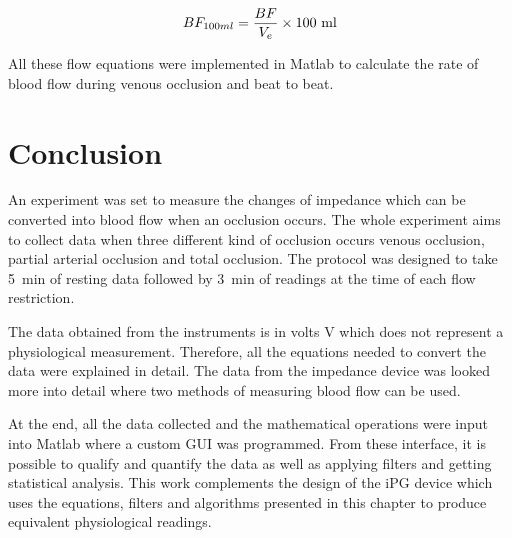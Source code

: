 \begin{align}
	\label{eq:bfpct}
	BF_{100ml} = \frac{BF}{V_e} \times \text{100 ml} \tagaddtext{[\si{\bfv}]}
\end{align}

All these flow equations were implemented in Matlab to calculate the rate of blood flow during venous occlusion and beat to beat.

\section{Conclusion}
An experiment was set to measure the changes of impedance which can be converted into blood flow when an occlusion occurs. The whole experiment aims to collect data when three different kind of occlusion occurs venous occlusion, partial arterial occlusion and total occlusion. The protocol was designed to take \SI{5}{\minute} of resting data followed by \SI{3}{\minute} of readings at the time of each flow restriction.

The data obtained from the instruments is in volts \si{\volt} which does not represent a physiological measurement. Therefore, all the equations needed to convert the data were explained in detail. The data from the impedance device was looked more into detail where two methods of measuring blood flow can be used. 

At the end, all the data collected and the mathematical operations were input into Matlab where a custom GUI was programmed. From these interface, it is possible to qualify and quantify the data as well as applying filters and getting statistical analysis. This work complements the design of the iPG device which uses the equations, filters and algorithms presented in this chapter to produce equivalent physiological readings.


